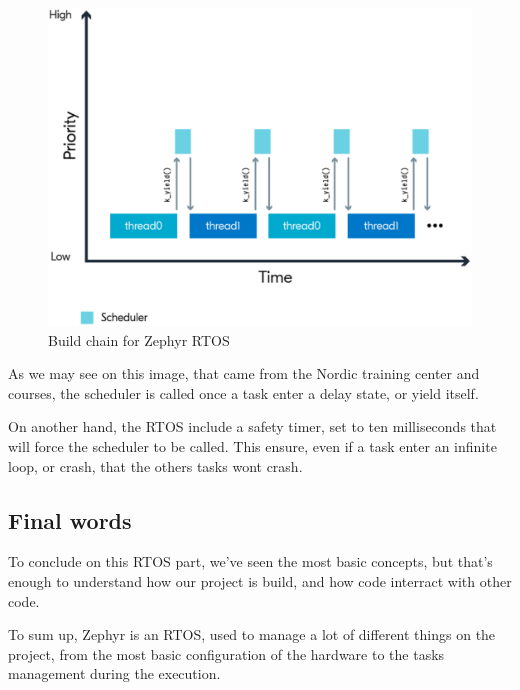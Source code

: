 \begin{figure}[!hbt]
    \centering
    \includegraphics[width=\SchematicWidth]{images/Zephyr/ThreadMGNT.eps}
    \caption{Build chain for Zephyr RTOS}
\end{figure}
\FloatBarrier

As we may see on this image, that came from the Nordic training center \cite{NordicFundamentals} 
and \cite{NordicAdvanced} courses, the scheduler is called once a task enter a delay state, or 
yield itself.

On another hand, the RTOS include a safety timer, set to ten milliseconds that will force the
scheduler to be called. This ensure, even if a task enter an infinite loop, or crash, that
the others tasks wont crash.

\subsection{Final words}
To conclude on this RTOS part, we've seen the most basic concepts, but that's enough to
understand how our project is build, and how code interract with other code.

To sum up, Zephyr is an RTOS, used to manage a lot of different things on the project, 
from the most basic configuration of the hardware to the tasks management during the 
execution.
